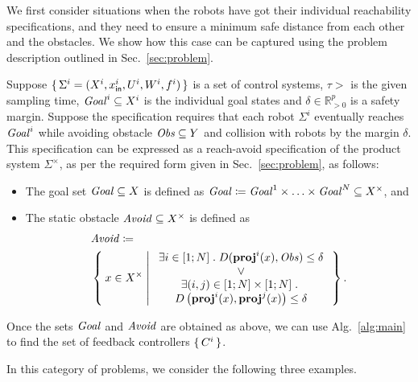 We first consider situations when the robots have got their individual reachability specifications, and they need to ensure a minimum safe distance from each other and the obstacles.
We show how this case can be captured using the problem description outlined in Sec.~\ref{sec:problem}.

Suppose $\set{\Sigma^i=(X^i,x_{\mathsf{in}}^i,U^i,W^i,f^i)}$ is a set of control systems, $\tau>$ is the given sampling time, $\mathit{Goal}^i\subseteq X^i$ is the individual goal states and $\delta \in \mathbb{R}^p_{>0}$ is a safety margin.
Suppose the specification requires that each robot $\Sigma^i$ eventually reaches $\mathit{Goal}^i$ while avoiding obstacle $\mathit{Obs}\subseteq Y$ and collision with robots by the margin $\delta$.
This specification can be expressed as a reach-avoid specification of the product system $\Sigma^\times$, as per the required form given in Sec.~\ref{sec:problem}, as follows:
\begin{itemize}
	\item The goal set $\mathit{Goal}\subseteq X$ is defined as $\mathit{Goal} \coloneqq \mathit{Goal}^1\times \ldots \times \mathit{Goal}^N \subseteq X^\times$, and
	\item The static obstacle $\mathit{Avoid}\subseteq X^\times$ is defined as 
		\begin{align}
			&\mathit{Avoid} \coloneqq\nonumber\\ 
				&\Set{ x\in X^\times | 
					\begin{array}{c}
						\exists i\in [1;N]\;.\; D(\mathbf{proj}^i(x),\mathit{Obs}) \leq \delta\\
						\vee\\
						 \exists (i,j)\in [1;N]\times [1;N]\;.\;\\ D\left(\mathbf{proj}^i(x),\mathbf{proj}^j(x)\right)\leq\delta
					\end{array}}.
		\end{align}
\end{itemize}
Once the sets $\mathit{Goal}$ and $\mathit{Avoid}$ are obtained as above, we can use Alg.~\ref{alg:main} to find the set of feedback controllers $\set{C^i}$.

In this category of problems, we consider the following three examples.

